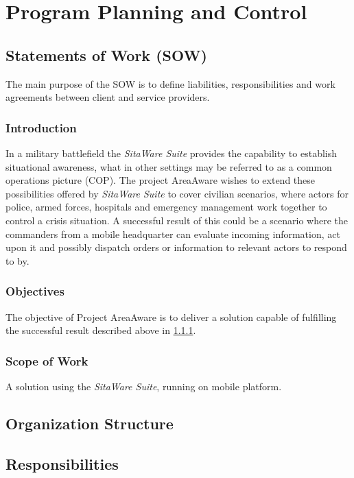 %
\thispagestyle{fancy}
\chapter{Program Planning and Control}
\label{chp:program_plan}


\section{Statements of Work (SOW)}
The main purpose of the SOW is to define liabilities, responsibilities and work agreements between client and service providers.

\subsection{Introduction}\label{sec:sow_intro}
In a military battlefield the \emph{SitaWare Suite} provides the capability to establish situational awareness, what in other settings may be referred to as a common operations picture (COP).
The project AreaAware wishes to extend these possibilities offered by \emph{SitaWare Suite} to cover civilian scenarios, where actors for police, armed forces, hospitals and emergency management work together to control a crisis situation.
A successful result of this could be a scenario where the commanders from a mobile headquarter can evaluate incoming information, act upon it and possibly dispatch orders or information to relevant actors to respond to by.

\subsection{Objectives}
The objective of Project AreaAware is to deliver a solution capable of fulfilling the successful result described above in \ref{sec:sow_intro}.

\subsection{Scope of Work}
A solution using the \emph{SitaWare Suite}, running on mobile platform.

\section{Organization Structure}


\section{Responsibilities}

